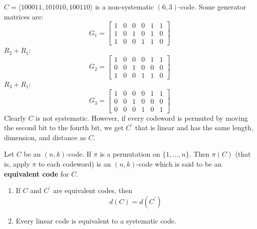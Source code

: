\begin{exbox}
    \begin{example}
        $ C=\langle 100011,101010,100110\rangle $
        is a non-systematic $ (6,3) $-code.
        Some generator matrices are:
        \[ G_1=\left[
                \begin{array}{ccc|ccc}
                    1 & 0 & 0 & 0 & 1 & 1 \\
                    1 & 0 & 1 & 0 & 1 & 0 \\
                    1 & 0 & 0 & 1 & 1 & 0
                \end{array} \right] \]
        $ R_2+R_1 $:
        \[ G_2= \left[
                \begin{array}{ccc|ccc}
                    1 & 0 & 0 & 0 & 1 & 1 \\
                    0 & 0 & 1 & 0 & 0 & 0 \\
                    1 & 0 & 0 & 1 & 1 & 0
                \end{array} \right] \]
        $ R_3+R_1 $:
        \[ G_3=\left[
                \begin{array}{ccc|ccc}
                    1 & 0 & 0 & 0 & 1 & 1 \\
                    0 & 0 & 1 & 0 & 0 & 0 \\
                    0 & 0 & 0 & 1 & 0 & 1
                \end{array} \right] \]
        Clearly $ C $ is not systematic. However, if every codeword
        is permuted by moving the second bit to the fourth bit, we get $ C^{\prime} $
        that is linear and has the same length, dimension, and distance as $ C $.
    \end{example}
\end{exbox}

\begin{defbox}
    \begin{definition}
        Let $ C $ be an $ (n,k) $-code. If $ \pi $ is a permutation on
        $ \{1,\ldots ,n\} $. Then $ \pi(C) $ (that is, apply $ \pi $ to each
        codeword) is an $ (n,k) $-code which is said to be an \textbf{equivalent code}
        for $ C $.
    \end{definition} \end{defbox}

\begin{thmbox}
    \begin{theorem}
        \begin{enumerate}[(1)]
            \item If $ C $ and $ C^{\prime} $ are equivalent codes, then
                  \[ d(C)=d(C^{\prime}) \]
            \item Every linear code is equivalent to a systematic code.
        \end{enumerate}
    \end{theorem} \end{thmbox}

